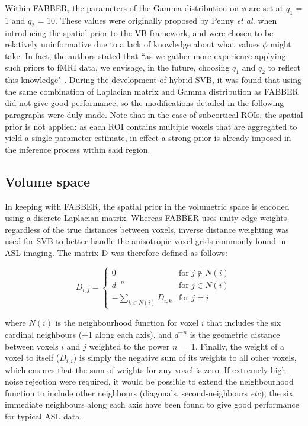 Within FABBER, the parameters of the Gamma distribution on $\phi$ are set at $q_1$ = 1 and $q_2$ = 10. These values were originally proposed by Penny \textit{et al.} when introducing the spatial prior to the VB framework, and were chosen to be relatively uninformative due to a lack of knowledge about what values $\phi$ might take. In fact, the authors stated that ``as we gather more experience applying such priors to fMRI data, we envisage, in the future, choosing $q_1$ and $q_2$ to reflect this knowledge" \cite{Penny2005}. During the development of hybrid SVB, it was found that using the same combination of Laplacian matrix and Gamma distribution as FABBER did not give good performance, so the modifications detailed in the following paragraphs were duly made. Note that in the case of subcortical ROIs, the spatial prior is not applied: as each ROI contains multiple voxels that are aggregated to yield a single parameter estimate, in effect a strong prior is already imposed in the inference process within said region.  

\subsection{Volume space}

In keeping with FABBER, the spatial prior in the volumetric space is encoded using a discrete Laplacian matrix. Whereas FABBER uses unity edge weights regardless of the true distances between voxels, inverse distance weighting was used for SVB to better handle the anisotropic voxel grids commonly found in ASL imaging. The matrix $\mathrm{D}$ was therefore defined as follows: 

\begin{equation}
  D_{i,j} =
  \begin{cases}
    0 & \text{for } j \notin N(i) \\
    d^{-n} & \text{for } j \in N(i) \\
    -\sum\limits_{k \in N(i)} D_{i,k} & \text{for } j = i 
  \end{cases}
\end{equation}

where $N(i)$ is the neighbourhood function for voxel $i$ that includes the six cardinal neighbours ($\pm$1 along each axis), and $d^{-n}$ is the geometric distance between voxels $i$ and $j$ weighted to the power $n =$ 1. Finally, the weight of a voxel to itself ($D_{i,i}$) is simply the negative sum of its weights to all other voxels, which ensures that the sum of weights for any voxel is zero. If extremely high noise rejection were required, it would be possible to extend the neighbourhood function to include other neighbours (diagonals, second-neighbours \textit{etc}); the six immediate neighbours along each axis have been found to give good performance for typical ASL data. 

